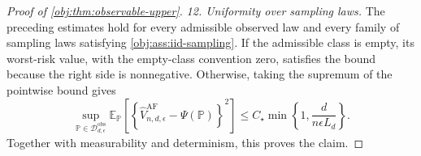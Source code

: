 \begin{proof}[Proof of \cref{obj:thm:observable-upper}]
\textit{12. Uniformity over sampling laws.}
The preceding estimates hold for every admissible observed law and every family of sampling laws satisfying \cref{obj:ass:iid-sampling}. If the admissible class is empty, its worst-risk value, with the empty-class convention zero, satisfies the bound because the right side is nonnegative. Otherwise, taking the supremum of the pointwise bound gives
\[
\sup_{\mathbb P\in\mathcal D_{d,\epsilon}^{\mathrm{obs}}}
\mathbb E_{\mathbb P}
\left[
\left\{
\widehat V_{n,d,\epsilon}^{\mathrm{AF}}-\Psi(\mathbb P)
\right\}^{2}
\right]
\le
C_\star\min\left\{1,\frac{d}{n\epsilon L_d}\right\}.
\]
Together with measurability and determinism, this proves the claim.
\end{proof}

